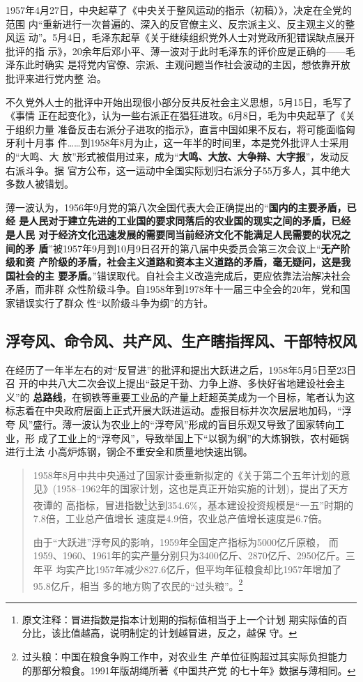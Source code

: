 1957年4月27日，中央起草了《中央关于整风运动的指示（初稿）》，决定在全党的范围
内“重新进行一次普遍的、深入的反官僚主义、反宗派主义、反主观主义的整风运
动”。5月4日，毛泽东起草《关于继续组织党外人士对党政所犯错误缺点展开批评的指
示》，20余年后邓小平、薄一波对于此时毛泽东的评价应是正确的——毛泽东此时确实
是将党内官僚、宗派、主观问题当作社会波动的主因，想依靠开放批评来进行党内整
治。

不久党外人士的批评中开始出现很小部分反共反社会主义思想，5月15日，毛写了《事情
正在起变化》，认为一些右派正在猖狂进攻。6月8日，毛为中央起草了《关于组织力量
准备反击右派分子进攻的指示》，直言中国如果不反右，将可能面临匈牙利十月事
件……到1958年8月为止，这一年半的时间里，本是党外批评人士采用的“大鸣、大
放”形式被借用过来，成为“\textbf{大鸣、大放、大争辩、大字报}”，发动反右派斗争。据
官方公布，这一运动中全国实际划归右派分子55万多人，其中绝大多数人被错划。

薄一波认为，1956年9月党的第八次全国代表大会正确提出的“\textbf{国内的主要矛盾，已经
  是人民对于建立先进的工业国的要求同落后的农业国的现实之间的矛盾，已经是人民
  对于经济文化迅速发展的需要同当前经济文化不能满足人民需要的状况之间的矛
  盾}”被1957年9月到10月9日召开的第八届中央委员会第三次会议上“\textbf{无产阶级和资
  产阶级的矛盾，社会主义道路和资本主义道路的矛盾，毫无疑问，这是我国社会的主
  要矛盾。}”错误取代。自社会主义改造完成后，更应依靠法治解决社会矛盾，而非群
众性阶级斗争。自1958年到1978年十一届三中全会的20年，党和国家错误实行了群众
性“以阶级斗争为纲”的方针。\cite[620-632]{boyibo}

\subsection{浮夸风、命令风、共产风、生产瞎指挥风、干部特权风}

在经历了一年半左右的对“反冒进”的批评和提出大跃进之后，1958年5月5日至23日召
开的中共八大二次会议上提出“鼓足干劲、力争上游、多快好省地建设社会主义”的
\textbf{总路线}，在钢铁等重要工业品的产量上赶超英美成为一个目标，笔者认为这
标志着在中央政府层面上正式开展大跃进运动。虚报目标并次次层层地加码，“浮夸
风”盛行。薄一波认为农业上的“浮夸风”形成的盲目乐观又导致了国家转向工业，形
成了工业上的“浮夸风”，导致举国上下“以钢为纲”的大炼钢铁，农村砸锅进行土法
小高炉炼钢，钢企不重安全和质量地快速出钢。

\begin{quotation}
  1958年8月中共中央通过了国家计委重新拟定的《关于第二个五年计划的意
  见》(1958--1962年的国家计划，这也是真正开始实施的计划)，提出了天方夜谭的
  高指标，冒进指数\footnote{原文注释：冒进指数是指本计划期的指标值相当于上一个计划
    期实际值的百分比，该比值越高，说明制定的计划越冒进，反之，越保
    守。}达到354.6\%，基本建设投资规模是“一五”时期的7.8倍，工业总产值增长
  速度是4.9倍，农业总产值增长速度是6.7倍。\cite{shiyiwu}

  由于“大跃进”浮夸风的影响，1959年全国定产指标为5000亿斤原粮，
  而1959、1960、1961年的实产量分别只为3400亿斤、2870亿斤、2950亿斤。三年平
  均实产比1957年减少827.6亿斤，但平均年征粮食却比1957年增加了95.8亿斤，相当
  多的地方购了农民的“过头粮”。\footnote{过头粮：中国在粮食争购工作中，对农业生
    产单位征购超过其实际负担能力的那部分粮食。1991年版胡绳所著《中国共产党
    的七十年》数据与薄相同。}\cite[278]{boyibo}
\end{quotation}


